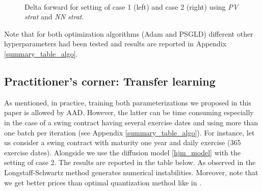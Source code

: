 \documentclass{article}
\numberwithin{equation}{section}
\begin{document}
\begin{figure}[ht]
\centering

%
~
\caption{Delta forward for setting of case 1 (left) and case 2 (right) using \textit{PV strat} and \textit{NN strat}.}
\label{deltas_forward}
\end{figure}


Note that for both optimization algorithms (Adam and PSGLD) different other hyperparameters had been tested and results are reported in Appendix \ref{summary_table_algo}.



\subsection{Practitioner's corner: Transfer learning}
\label{transfer_learn}

\indent

As mentioned, in practice, training both parameterizations we proposed in this paper is allowed by AAD. However, the latter can be time consuming especially in the case of a swing contract having several exercise dates and using more than one batch per iteration (see Appendix \ref{summary_table_algo}). For instance, let us consider a swing contract with maturity one year and daily exercise (365 exercise dates). Alongside we use the diffusion  model \eqref{hjm_model} with the setting of case 2. The results are reported in the table below. As observed in \cite{BarreraEsteve2006NumericalMF} the Longstaff-Schwartz method generates numerical instabilities. Moreover, note that we get better prices than optimal quantization method like in \cite{Bardou2009OptimalQF}.
\end{document}
